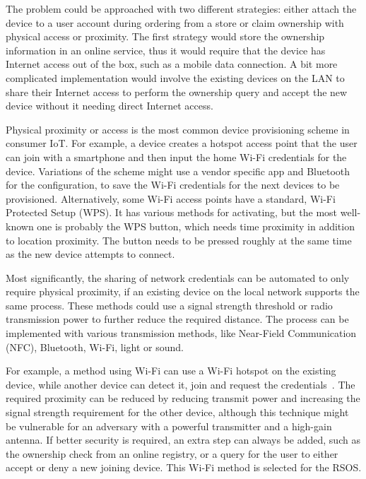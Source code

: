 The problem could be approached with two different strategies: either attach the device to a user account during ordering from a store or claim ownership with physical access or proximity. The first strategy would store the ownership information in an online service, thus it would require that the device has Internet access out of the box, such as a mobile data connection. A bit more complicated implementation would involve the existing devices on the LAN to share their Internet access to perform the ownership query and accept the new device without it needing direct Internet access.

Physical proximity or access is the most common device provisioning scheme in consumer IoT. For example, a device creates a hotspot access point that the user can join with a smartphone and then input the home Wi-Fi credentials for the device. Variations of the scheme might use a vendor specific app and Bluetooth for the configuration, to save the Wi-Fi credentials for the next devices to be provisioned. Alternatively, some Wi-Fi access points have a standard, Wi-Fi Protected Setup (WPS). It has various methods for activating, but the most well-known one is probably the WPS button, which needs time proximity in addition to location proximity. The button needs to be pressed roughly at the same time as the new device attempts to connect.~\cite{A_primer_to_Wi-Fi_provisioning_for_IoT_applications}

Most significantly, the sharing of network credentials can be automated to only require physical proximity, if an existing device on the local network supports the same process. These methods could use a signal strength threshold or radio transmission power to further reduce the required distance. The process can be implemented with various transmission methods, like Near-Field Communication (NFC), Bluetooth, Wi-Fi, light or sound.

For example, a method using Wi-Fi can use a Wi-Fi hotspot on the existing device, while another device can detect it, join and request the credentials~\cite{Scalable_IoT_Platform_for_Heterogeneous_Devices_in_Smart_Environments}. The required proximity can be reduced by reducing transmit power and increasing the signal strength requirement for the other device, although this technique might be vulnerable for an adversary with a powerful transmitter and a high-gain antenna. If better security is required, an extra step can always be added, such as the ownership check from an online registry, or a query for the user to either accept or deny a new joining device. This Wi-Fi method is selected for the RSOS.

